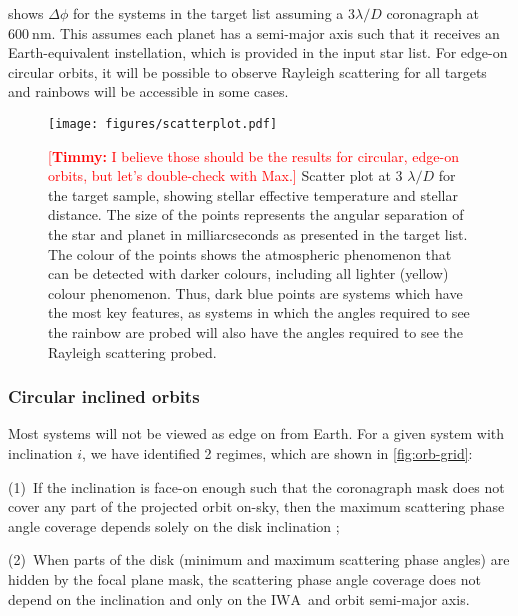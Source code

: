 \documentclass[
    usenatbib,
]{mnras}
\newcommand{\timmy}[1]{\textcolor{red}{[\textbf{Timmy:} #1]}} %
\newcommand{\IWA}{\ensuremath{\mathrm{IWA}}}
\begin{document}
 shows $\Delta \phi$ for the systems in the target list assuming a $3 \lambda / D$ coronagraph at $\SI{600}{\nano\meter}$. 
%
This assumes each planet has a semi-major axis such that it receives an Earth-equivalent instellation, which is provided in the input star list.
%
For edge-on circular orbits, it will be possible to observe Rayleigh scattering for all targets and rainbows will be accessible in some cases.

\begin{figure*}
    \centering
    \texttt{[image: figures/scatterplot.pdf]}
    \caption{
        \timmy{I believe those should be the results for circular, edge-on orbits, but let's double-check with Max.}
        Scatter plot at 3 $\lambda/D$ for the target sample, showing stellar effective temperature and stellar distance. 
        The size of the points represents the angular separation of the star and planet in milliarcseconds as presented in the target list. 
        The colour of the points shows the atmospheric phenomenon that can be detected with darker colours, including all lighter (yellow) colour phenomenon. 
        Thus, dark blue points are systems which have the most key features, as systems in which the angles required to see the rainbow are probed will also have the angles required to see the Rayleigh scattering probed.
    }
    \label{fig:scatterplot}
\end{figure*}


\subsubsection{Circular inclined orbits}

Most systems will not be viewed as edge on from Earth.
%
For a given system with inclination $i$, we have identified 2 regimes, which are shown in \cref{fig:orb-grid}:

(1)~If the inclination is face-on enough such that the coronagraph mask does not cover any part of the projected orbit on-sky, then the maximum scattering phase angle coverage depends solely on the disk inclination ;

(2)~When parts of the disk (minimum and maximum scattering phase angles) are hidden by the focal plane mask, the scattering phase angle coverage does not depend on the inclination and only on the \IWA\ and orbit semi-major axis. 
\end{document}

